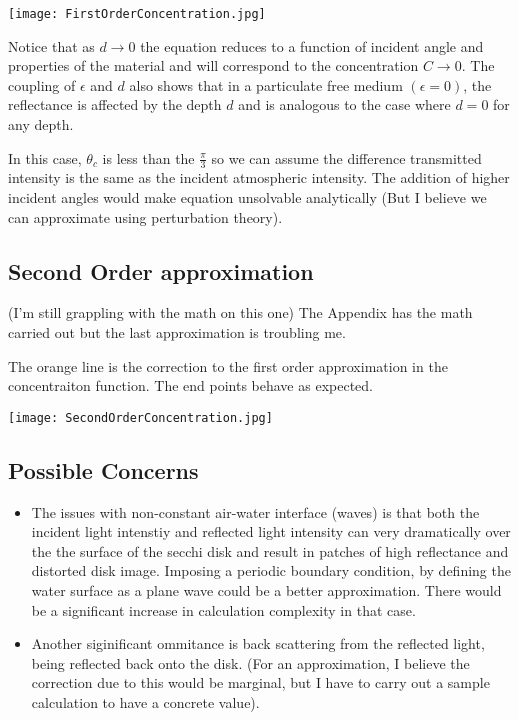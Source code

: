 \documentclass{article}
\begin{document}
\begin{center}
  \texttt{[image: FirstOrderConcentration.jpg]}
\end{center}
Notice that as $d \rightarrow 0 $ the equation reduces to a function of incident angle and properties
of the material and will correspond to the concentration $ C \rightarrow 0 $. The coupling
of $ \epsilon$ and $d$ also shows that in a particulate free medium $(\epsilon = 0)$, the
reflectance is affected by the depth $ d$ and is analogous to the case where $ d = 0$ for
any depth.

In this case, $ \theta_c$ is less than the $ \frac{\pi}{3}$ so we can assume the
difference transmitted intensity is the same as the incident atmospheric intensity. The addition
of higher incident angles would make equation unsolvable analytically
(But I believe we can approximate using perturbation theory).
\subsection{Second Order approximation}
(I'm still grappling with the math on this one)
The Appendix has the math carried out but the last approximation is troubling me.

The orange line is the correction to the first order approximation in the concentraiton
function. The end points behave as expected.
\begin{center}
\texttt{[image: SecondOrderConcentration.jpg]}
\end{center}

\subsection{Possible Concerns}

\begin{itemize}
  \item The issues with non-constant air-water interface (waves) is that both the incident
  light intenstiy and reflected light intensity can very dramatically over the the
  surface of the secchi disk and result in patches of high reflectance and distorted disk
  image. Imposing a periodic boundary condition, by defining the water surface as a plane
  wave could be a better approximation. There would be a significant increase in calculation
  complexity in that case.
  \item Another siginificant ommitance is back scattering from the reflected light, being reflected
  back onto the disk. (For an approximation, I believe the correction due to this would be
  marginal, but I have to carry out a sample calculation to have a concrete value).
\end{itemize}
\end{document}
